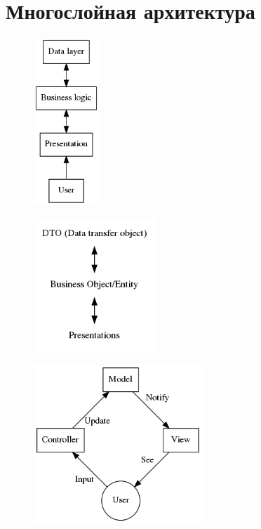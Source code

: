 \documentclass[11pt,a4paper]{article}
\begin{document}
\section{Многослойная архитектура}
\begin{figure}[H]
	\centering
	\begin{minipage}{.3\textwidth}
		\centering
		\includegraphics[width=70pt]{pics/layers.png}
		\label{fig:layers}
	\end{minipage}%
	\begin{minipage}{.3\textwidth}
		\centering
		\includegraphics[width=130pt]{pics/dto.png}
		\label{fig:dto}
	\end{minipage}
	\begin{minipage}{.35\textwidth}
		\centering
		\includegraphics[width=180pt]{pics/mvc.png}
		\label{fig:dto}
	\end{minipage}
\end{figure}
\end{document}
